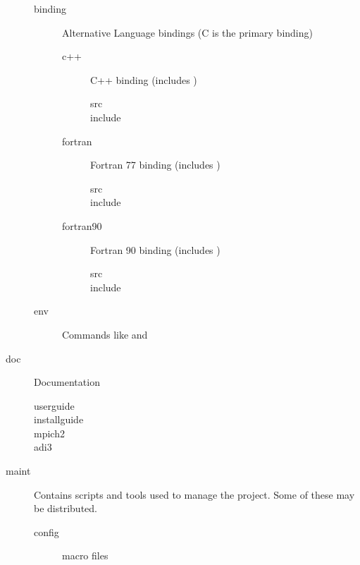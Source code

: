 \documentclass{article}
\begin{document}
\begin{description}
\begin{description}
  \item[binding]Alternative Language bindings (C is the primary binding)
    \begin{description}
    \item[c++]C++ binding (includes )
      \begin{description}
      \item[src]
      \item[include]
      \end{description}
    \item[fortran]Fortran 77 binding (includes )
      \begin{description}
      \item[src]
      \item[include]
      \end{description}
    \item[fortran90]Fortran 90 binding (includes )
      \begin{description}
      \item[src]
      \item[include]
      \end{description}
    \end{description}
  \item[env]Commands like  and 
  \end{description}
  

\item[doc]Documentation
  \begin{description}
    \item[userguide]
    \item[installguide]
    \item[mpich2]
    \item[adi3]
  \end{description}


\item[maint]
  Contains scripts and tools used to manage the project.  Some of these may be
  distributed.
  \begin{description}
  \item[config] macro files
  \end{description}


\end{description}
\end{document}
